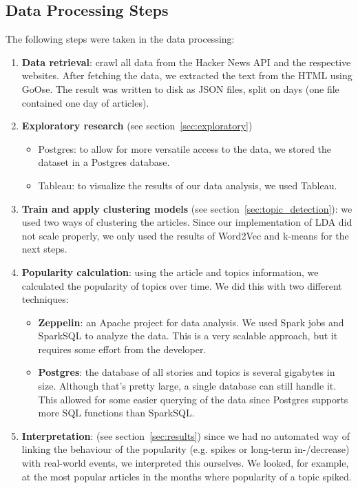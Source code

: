 \subsection{Data Processing Steps}
The following steps were taken in the data processing:
\begin{enumerate}
	\item \textbf{Data retrieval}: crawl all data from the Hacker News API and the respective websites. After fetching the data, we extracted the text from the HTML using GoOse. The result was written to disk as JSON files, split on days (one file contained one day of articles).
	\item \textbf{Exploratory research} (see section~\ref{sec:exploratory})
		\begin{itemize}
			\item Postgres: to allow for more versatile access to the data, we stored the dataset in a Postgres database.
			\item Tableau: to visualize the results of our data analysis, we used Tableau.
		\end{itemize}
	\item \textbf{Train and apply clustering models} (see section~\ref{sec:topic_detection}): we used two ways of clustering the articles. Since our implementation of LDA did not scale properly, we only used the results of Word2Vec and k-means for the next steps.
	\item \textbf{Popularity calculation}: using the article and topics information, we calculated the popularity of topics over time. We did this with two different techniques:
		\begin{itemize}
			\item \textbf{Zeppelin}: an Apache project for data analysis. We used Spark jobs and SparkSQL to analyze the data. This is a very scalable approach, but it requires some effort from the developer.
			\item \textbf{Postgres}: the database of all stories and topics is several gigabytes in size. Although that's pretty large, a single database can still handle it. This allowed for some easier querying of the data since Postgres supports more SQL functions than SparkSQL.
		\end{itemize}
	\item \textbf{Interpretation}: (see section~\ref{sec:results}) since we had no automated way of linking the behaviour of the popularity (e.g. spikes or long-term in-/decrease) with real-world events, we interpreted this ourselves. We looked, for example, at the most popular articles in the months where popularity of a topic spiked.
\end{enumerate}

